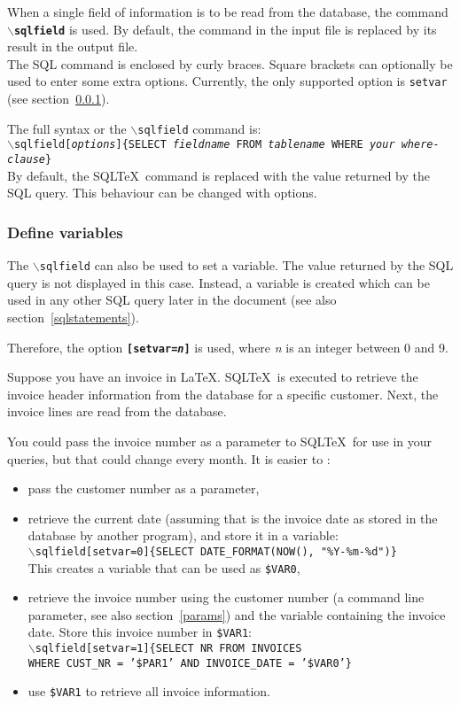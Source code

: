 \documentclass{article}
\newcommand{\bs}{\ensuremath{\backslash}}
\newcommand{\vs}{\vspace{3mm}}
\begin{document}
When a single field of information is to be read from the database, the command \texttt{\textbf{\bs sqlfield}}
is used. By default, the command in the input file is replaced by its result in the output file.\\
The SQL command is enclosed by curly braces. Square brackets can optionally be used to enter some extra options.
Currently, the only supported option is \texttt{setvar} (see section~\ref{vars}).

The full syntax or the \texttt{\bs sqlfield} command is:\\
\texttt{\bs sqlfield[\textit{options}]\{SELECT \textit{fieldname} FROM \textit{tablename} WHERE \textit{your where-clause}\}} \\
By default, the SQL\TeX\ command is replaced with the value returned by the SQL query. This behaviour
can be changed with options.


\subsubsection{Define variables}\label{vars}

The \texttt{\bs sqlfield} can also be used to set a variable. The value returned by the SQL query is not
displayed in this case. Instead, a variable is created which can be used in any other SQL query later in
the document (see also section~\ref{sqlstatements}).

Therefore, the option \texttt{\textbf{[setvar=\textit{n}]}} is used, where \textit{n} is an integer between
0 and 9.

\vs

Suppose you have an invoice in \LaTeX. SQL\TeX\ is executed to retrieve the invoice header information
from the database for a specific customer. Next, the invoice lines are read from the database.

You could pass the invoice number as a parameter to SQL\TeX\ for use in your queries, but that could
change every month. It is easier to :\\
\begin{itemize}
\item pass the customer number as a parameter,
\item retrieve the current date (assuming that is the invoice date as stored in
the database by another program), and store it in a variable: \\
\texttt{\bs sqlfield[setvar=0]\{SELECT DATE\_FORMAT(NOW(), "\%Y-\%m-\%d")\}} \\
This creates a variable that can be used as \texttt{\$VAR0},
\item retrieve the invoice number using the customer number (a command line parameter,
see also section~\ref{params}) and the variable containing the invoice date.
Store this invoice number in \texttt{\$VAR1}: \\
\texttt{\bs sqlfield[setvar=1]\{SELECT NR FROM INVOICES \\
WHERE CUST\_NR = '\$PAR1' AND INVOICE\_DATE = '\$VAR0'\}}
\item use \texttt{\$VAR1} to retrieve all invoice information.
\end{itemize}
\end{document}

